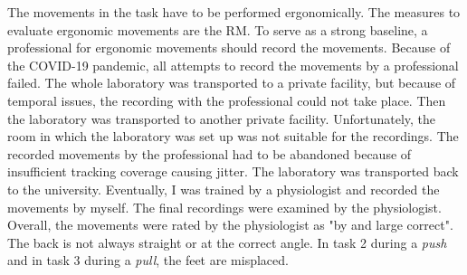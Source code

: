 The movements in the task have to be performed ergonomically. The measures to evaluate ergonomic movements are the RM. To serve as a strong baseline, a professional for ergonomic movements should record the movements. Because of the COVID-19 pandemic, all attempts to record the movements by a professional failed. The whole laboratory was transported to a private facility, but because of temporal issues, the recording with the professional could not take place. Then the laboratory was transported to another private facility. Unfortunately, the room in which the laboratory was set up was not suitable for the recordings. The recorded movements by the professional had to be abandoned because of insufficient tracking coverage causing jitter. The laboratory was transported back to the university. Eventually, I was trained by a physiologist and recorded the movements by myself. The final recordings were examined by the physiologist. Overall, the movements were rated by the physiologist as "by and large correct". The back is not always straight or at the correct angle. In task 2 during a \textit{push} and in task 3 during a \textit{pull}, the feet are misplaced.\\

